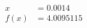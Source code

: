 \documentclass[preview]{standalone}
\begin{document}
\begin{align*}
x &= 0.0014\\f(x) &= 4.0095115
\end{align*}
\end{document}
